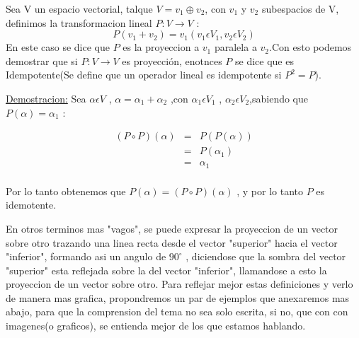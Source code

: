 \documentclass[11pt,spanish,a4paper]{article}
\begin{document}
\item Sea V un espacio vectorial, talque $V = v_1 \oplus v_2$, con $v_1$ y $v_2$ subespacios de V, definimos la transformacion lineal $P:V \rightarrow V$ :
\[P(v_1 + v_2) = v_1 (v_1 \epsilon V_1, v_2 \epsilon V_2)\]
En este caso se dice que $P$ es la proyeccion a $v_1$ paralela a $v_2$.Con esto podemos demostrar que si $P: V \rightarrow V$ es proyección, enotnces $P$ se dice que es Idempotente(Se define que un operador lineal es idempotente si $P^2 = P$).

\underline{Demostracion:} \linebreak
Sea $\alpha \epsilon V$ , $\alpha = \alpha_1 + \alpha_2$ ,con $\alpha_1 \epsilon V_1$ , $\alpha_2 \epsilon V_2$,sabiendo que $P(\alpha)= \alpha_1$ : \linebreak

\begin{eqnarray*}
(P \circ P) (\alpha) & = & P(P(\alpha))\\
& = & P(\alpha_1)\\
& = & \alpha_1\\
\end{eqnarray*}

Por lo tanto obtenemos que $P(\alpha) = (P \circ P)(\alpha)$ , y por lo tanto $P$ es idemotente.
\linebreak
\linebreak

En otros terminos mas "vagos", se puede expresar la proyeccion de un vector sobre otro trazando una linea recta desde el vector "superior" hacia el vector "inferior", formando asi un angulo de $90^\circ$ , diciendose que la sombra del vector "superior" esta reflejada sobre la del vector "inferior", llamandose a esto la proyeccion de un vector sobre otro.
Para reflejar mejor estas definiciones y verlo de manera mas grafica, propondremos un par de ejemplos que anexaremos mas abajo, para que la comprension del tema no sea solo escrita, si no, que con con imagenes(o graficos), se entienda mejor de los que estamos hablando.
\end{document}
